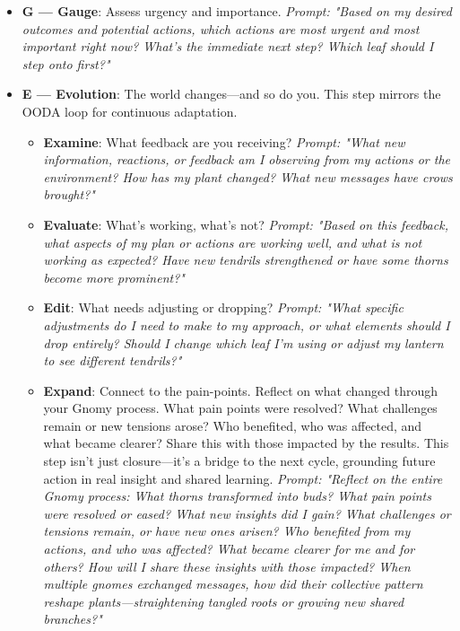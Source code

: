 \documentclass{article}
\begin{document}
\begin{itemize}[noitemsep,topsep=0pt]
\begin{itemize}[noitemsep,topsep=0pt]
    \end{itemize}
    \item \textbf{G — Gauge}: Assess urgency and importance. \textit{Prompt: "Based on my desired outcomes and potential actions, which actions are most urgent and most important right now? What's the immediate next step? Which leaf should I step onto first?"}
    \item \textbf{E — Evolution}: The world changes—and so do you. This step mirrors the OODA loop for continuous adaptation.
    \begin{itemize}[noitemsep,topsep=0pt]
        \item \textbf{Examine}: What feedback are you receiving? \textit{Prompt: "What new information, reactions, or feedback am I observing from my actions or the environment? How has my plant changed? What new messages have crows brought?"}
        \item \textbf{Evaluate}: What's working, what's not? \textit{Prompt: "Based on this feedback, what aspects of my plan or actions are working well, and what is not working as expected? Have new tendrils strengthened or have some thorns become more prominent?"}
        \item \textbf{Edit}: What needs adjusting or dropping? \textit{Prompt: "What specific adjustments do I need to make to my approach, or what elements should I drop entirely? Should I change which leaf I'm using or adjust my lantern to see different tendrils?"}
        \item \textbf{Expand}: Connect to the pain-points. Reflect on what changed through your Gnomy process. What pain points were resolved? What challenges remain or new tensions arose? Who benefited, who was affected, and what became clearer? Share this with those impacted by the results. This step isn't just closure—it's a bridge to the next cycle, grounding future action in real insight and shared learning. \textit{Prompt: "Reflect on the entire Gnomy process: What thorns transformed into buds? What pain points were resolved or eased? What new insights did I gain? What challenges or tensions remain, or have new ones arisen? Who benefited from my actions, and who was affected? What became clearer for me and for others? How will I share these insights with those impacted? When multiple gnomes exchanged messages, how did their collective pattern reshape plants—straightening tangled roots or growing new shared branches?"}
    \end{itemize}
\end{itemize}
\end{document}
